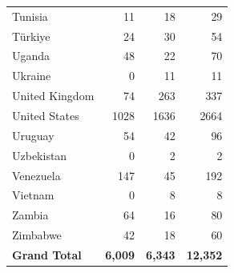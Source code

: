 \documentclass{article} %
\begin{document}
\begin{longtable}{l r r r}
Tunisia & 11 & 18 & 29 \\
Türkiye & 24 & 30 & 54 \\
Uganda & 48 & 22 & 70 \\
Ukraine & 0 & 11 & 11 \\
United Kingdom & 74 & 263 & 337 \\
United States & 1028 & 1636 & 2664 \\
Uruguay & 54 & 42 & 96 \\
Uzbekistan & 0 & 2 & 2 \\
Venezuela & 147 & 45 & 192 \\
Vietnam & 0 & 8 & 8 \\
Zambia & 64 & 16 & 80 \\
Zimbabwe & 42 & 18 & 60 \\
\midrule
\textbf{Grand Total} & \textbf{6,009} & \textbf{6,343} & \textbf{12,352} \\
\end{longtable}
\end{document}
